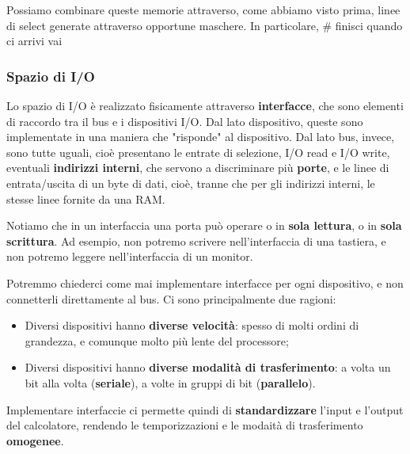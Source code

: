 \documentclass[a4paper,11pt]{article}
\begin{document}
Possiamo combinare queste memorie attraverso, come abbiamo visto prima, linee di select generate attraverso opportune maschere. 
In particolare, # finisci quando ci arrivi vai

\subsubsection{Spazio di I/O}
Lo spazio di I/O è realizzato fisicamente attraverso \textbf{interfacce}, che sono elementi di raccordo tra il bus e i dispositivi I/O.
Dal lato dispositivo, queste sono implementate in una maniera che "risponde" al dispositivo.
Dal lato bus, invece, sono tutte uguali, cioè presentano le entrate di selezione, I/O read e I/O write, eventuali \textbf{indirizzi interni}, che servono a discriminare più \textbf{porte}, e le linee di entrata/uscita di un byte di dati, cioè, tranne che per gli indirizzi interni, le stesse linee fornite da una RAM.

Notiamo che in un interfaccia una porta può operare o in \textbf{sola lettura}, o in \textbf{sola scrittura}.
Ad esempio, non potremo scrivere nell'interfaccia di una tastiera, e non potremo leggere nell'interfaccia di un monitor.

Potremmo chiederci come mai implementare interfacce per ogni dispositivo, e non connetterli direttamente al bus.
Ci sono principalmente due ragioni:
\begin{itemize}
	\item Diversi dispositivi hanno \textbf{diverse velocità}: spesso di molti ordini di grandezza, e comunque molto più lente del processore;
	\item Diversi dispositivi hanno \textbf{diverse modalità di trasferimento}: a volta un bit alla volta (\textbf{seriale}), a volte in gruppi di bit (\textbf{parallelo}).
\end{itemize}

Implementare interfaccie ci permette quindi di \textbf{standardizzare} l'input e l'output del calcolatore, rendendo le temporizzazioni e le modaità di trasferimento \textbf{omogenee}.
\end{document}
